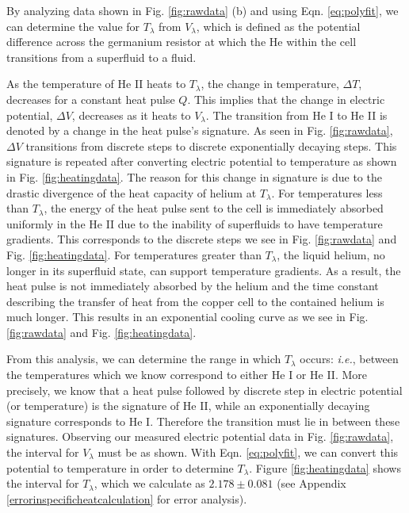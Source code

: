 By analyzing data shown in Fig. \ref{fig:rawdata} (b) and using Eqn. \ref{eq:polyfit}, we can determine the value for $T_{\lambda}$ from $V_{\lambda}$, which is defined as the potential difference across the germanium resistor at which the He within the cell transitions from a superfluid to a fluid. 

As the temperature of He II heats to $T_{\lambda}$, the change in temperature, $\Delta T$, decreases for a constant heat pulse $Q$.  This implies that the change in electric potential, $\Delta V$, decreases as it heats to $V_{\lambda}$.  The transition from He I to He II is denoted by a change in the heat pulse's signature.  As seen in Fig. \ref{fig:rawdata}, $\Delta V$ transitions from discrete steps to discrete exponentially decaying steps.  This signature is repeated after converting electric potential to temperature as shown in Fig. \ref{fig:heatingdata}.  The reason for this change in signature is due to the drastic divergence of the heat capacity of helium at $T_{\lambda}$.  For temperatures less than $T_{\lambda}$, the energy of the heat pulse sent to the cell is immediately absorbed uniformly in the He II due to the inability of superfluids to have temperature gradients.  This corresponds to the discrete steps we see in Fig. \ref{fig:rawdata} and Fig. \ref{fig:heatingdata}.  For temperatures greater than $T_{\lambda}$, the liquid helium, no longer in its superfluid state, can support temperature gradients.  As a result, the heat pulse is not immediately absorbed by the helium and the time constant describing the transfer of heat from the copper cell to the contained helium is much longer. This results in an exponential cooling curve as we see in Fig. \ref{fig:rawdata} and Fig. \ref{fig:heatingdata}.  

From this analysis, we can determine the range in which $T_{\lambda}$ occurs: \emph{i.e.}, between the temperatures which we know correspond to either He I or He II.  More precisely, we know that a heat pulse followed by discrete step in electric potential (or temperature) is the signature of He II, while an exponentially decaying signature corresponds to He I. Therefore the transition must lie in between these signatures.  Observing our measured electric potential data in Fig. \ref{fig:rawdata}, the interval for $V_{\lambda}$ must be as shown.  With Eqn. \ref{eq:polyfit}, we can convert this potential to temperature in order to determine $T_{\lambda}$.  Figure \ref{fig:heatingdata} shows the interval for $T_{\lambda}$, which we calculate as $2.178\pm0.081$ (see Appendix \ref{errorinspecificheatcalculation} for error analysis). 

